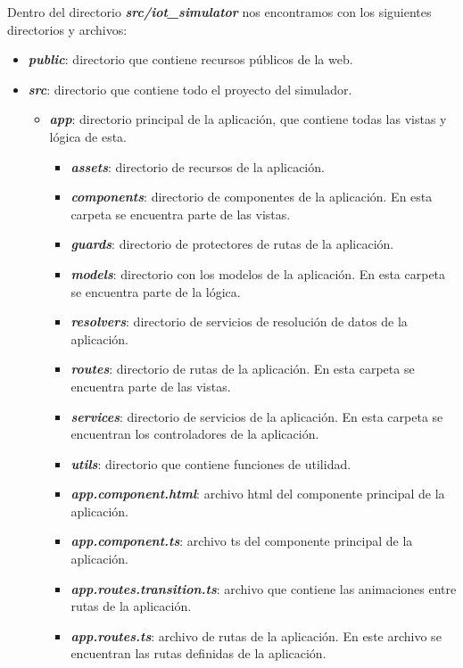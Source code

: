 Dentro del directorio \textit{\textbf{src/iot\_simulator}} nos encontramos con los siguientes directorios y archivos:
\begin{itemize}
    \item \textit{\textbf{public}}: directorio que contiene recursos públicos de la web.
    \item \textit{\textbf{src}}: directorio que contiene todo el proyecto del simulador.
     \begin{itemize}
        \item \textit{\textbf{app}}: directorio principal de la aplicación, que contiene todas las vistas y lógica de esta.
        \begin{itemize}
            \item \textit{\textbf{assets}}: directorio de recursos de la aplicación.
            \item \textit{\textbf{components}}: directorio de componentes de la aplicación. En esta carpeta se encuentra parte de las vistas.
            \item \textit{\textbf{guards}}: directorio de protectores de rutas de la aplicación.
            \item \textit{\textbf{models}}: directorio con los modelos de la aplicación. En esta carpeta se encuentra parte de la lógica.
            \item \textit{\textbf{resolvers}}: directorio de servicios de resolución de datos de la aplicación.
            \item \textit{\textbf{routes}}: directorio de rutas de la aplicación. En esta carpeta se encuentra parte de las vistas.
            \item \textit{\textbf{services}}: directorio de servicios de la aplicación. En esta carpeta se encuentran los controladores de la aplicación.
            \item \textit{\textbf{utils}}: directorio que contiene funciones de utilidad.
            \item \textit{\textbf{app.component.html}}: archivo html del componente principal de la aplicación.
            \item \textit{\textbf{app.component.ts}}: archivo ts del componente principal de la aplicación.
            \item \textit{\textbf{app.routes.transition.ts}}: archivo que contiene las animaciones entre rutas de la aplicación.
            \item \textit{\textbf{app.routes.ts}}: archivo de rutas de la aplicación. En este archivo se encuentran las rutas definidas de la aplicación.
        \end{itemize}
        

\end{itemize}
\end{itemize}
